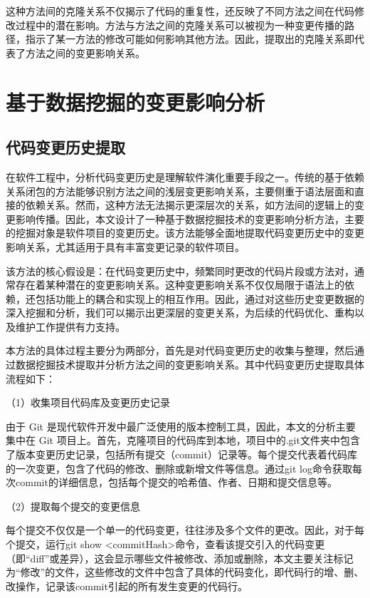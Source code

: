 这种方法间的克隆关系不仅揭示了代码的重复性，还反映了不同方法之间在代码修改过程中的潜在影响。方法与方法之间的克隆关系可以被视为一种变更传播的路径，指示了某一方法的修改可能如何影响其他方法。因此，提取出的克隆关系即代表了方法之间的变更影响关系。

\section{基于数据挖掘的变更影响分析}
\subsection{代码变更历史提取}

在软件工程中，分析代码变更历史是理解软件演化重要手段之一。传统的基于依赖关系闭包的方法能够识别方法之间的浅层变更影响关系，主要侧重于语法层面和直接的依赖关系。然而，这种方法无法揭示更深层次的关系，如方法间的逻辑上的变更影响传播。因此，本文设计了一种基于数据挖掘技术的变更影响分析方法，主要的挖掘对象是软件项目的变更历史。该方法能够全面地提取代码变更历史中的变更影响关系，尤其适用于具有丰富变更记录的软件项目。

该方法的核心假设是：在代码变更历史中，频繁同时更改的代码片段或方法对，通常存在着某种潜在的变更影响关系。这种变更影响关系不仅仅局限于语法上的依赖，还包括功能上的耦合和实现上的相互作用。因此，通过对这些历史变更数据的深入挖掘和分析，我们可以揭示出更深层的变更关系，为后续的代码优化、重构以及维护工作提供有力支持。

本方法的具体过程主要分为两部分，首先是对代码变更历史的收集与整理，然后通过数据挖掘技术提取并分析方法之间的变更影响关系。其中代码变更历史提取具体流程如下：

（1）收集项目代码库及变更历史记录

由于 Git 是现代软件开发中最广泛使用的版本控制工具，因此，本文的分析主要集中在 Git 项目上。首先，克隆项目的代码库到本地，项目中的.git文件夹中包含了版本变更历史记录，包括所有提交（commit）记录等。每个提交代表着代码库的一次变更，包含了代码的修改、删除或新增文件等信息。通过git log命令获取每次commit的详细信息，包括每个提交的哈希值、作者、日期和提交信息等。

（2）提取每个提交的变更信息

每个提交不仅仅是一个单一的代码变更，往往涉及多个文件的更改。因此，对于每个提交，运行git show <commitHash>命令，查看该提交引入的代码变更（即“diff”或差异），这会显示哪些文件被修改、添加或删除，本文主要关注标记为“修改”的文件，这些修改的文件中包含了具体的代码变化，即代码行的增、删、改操作，记录该commit引起的所有发生变更的代码行。

